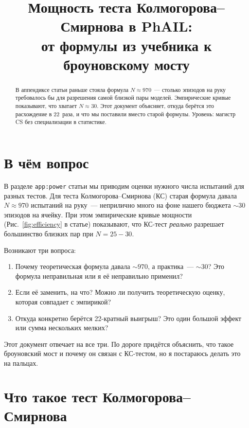 \documentclass[11pt]{article}
\title{Мощность теста Колмогорова--Смирнова в PhAIL:\\ от формулы из учебника к броуновскому мосту}
\author{}
\date{}
\begin{document}
\maketitle

\begin{abstract}
В аппендиксе статьи раньше стояла формула $N \approx 970$~--- столько эпизодов на руку требовалось бы для разрешения самой близкой пары моделей. Эмпирические кривые показывают, что хватает $N \approx 30$. Этот документ объясняет, откуда берётся это расхождение в 22~раза, и что мы поставили вместо старой формулы. Уровень: магистр CS без специализации в статистике.
\end{abstract}

\tableofcontents
\bigskip

\section{В чём вопрос}

В разделе \texttt{app:power} статьи мы приводим оценки нужного числа испытаний для разных тестов. Для теста Колмогорова--Смирнова (КС) старая формула давала $N \approx 970$ испытаний на руку~--- неприлично много на фоне нашего бюджета $\sim 30$ эпизодов на ячейку. При этом эмпирические кривые мощности (Рис.~\ref{fig:efficiency} в статье) показывают, что КС-тест \emph{реально} разрешает большинство близких пар при $N{=}25{-}30$.

Возникают три вопроса:
\begin{enumerate}[leftmargin=2em, itemsep=2pt]
\item Почему теоретическая формула давала $\sim 970$, а практика~--- $\sim 30$? Это формула неправильная или я её неправильно применил?
\item Если её заменить, на что? Можно ли получить теоретическую оценку, которая совпадает с эмпирикой?
\item Откуда конкретно берётся 22-кратный выигрыш? Это один большой эффект или сумма нескольких мелких?
\end{enumerate}

Этот документ отвечает на все три. По дороге придётся объяснить, что такое броуновский мост и почему он связан с КС-тестом, но я постараюсь делать это на пальцах.

\section{Что такое тест Колмогорова--Смирнова}
\end{document}
